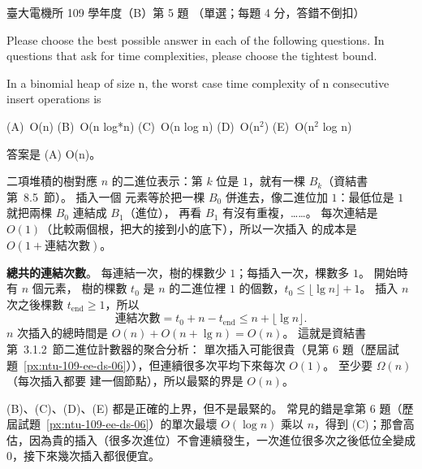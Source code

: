 \begin{pastexam}[label={px:ntu-109-ee-ds-05}]{臺大電機所 109 學年度（B）第 5 題}
（單選；每題 4 分，答錯不倒扣）

Please choose the best possible answer in each of the following questions. In questions that ask
for time complexities, please choose the tightest bound.

In a binomial heap of size n, the worst case time complexity of n consecutive insert operations is

(A)~O(n) \qquad (B)~O(n log*n) \qquad (C)~O(n log n) \qquad (D)~O(n$^2$) \qquad (E)~O(n$^2$ log n)
\end{pastexam}

\begin{pastsoln}
答案是 (A) O(n)。

二項堆積的樹對應 $n$ 的二進位表示：第 $k$ 位是 $1$，就有一棵 $B_k$（資結書第~8.5~節）。 插入一個
元素等於把一棵 $B_0$ 併進去，像二進位加 $1$：最低位是 $1$ 就把兩棵 $B_0$ 連結成 $B_1$（進位），
再看 $B_1$ 有沒有重複，……。 每次連結是 $O(1)$（比較兩個根，把大的接到小的底下），所以一次插入
的成本是 $O(1 + \text{連結次數})$。

\textbf{總共的連結次數}。 每連結一次，樹的棵數少 $1$；每插入一次，棵數多 $1$。 開始時有 $n$ 個元素，
樹的棵數 $t_0$ 是 $n$ 的二進位裡 $1$ 的個數，$t_0 \le \lfloor \lg n \rfloor + 1$。 插入 $n$ 次之後棵數
$t_{\text{end}} \ge 1$，所以
\[
\text{連結次數} = t_0 + n - t_{\text{end}} \le n + \lfloor \lg n \rfloor.
\]
$n$ 次插入的總時間是 $O(n) + O(n + \lg n) = O(n)$。 這就是資結書第~3.1.2~節二進位計數器的聚合分析：
單次插入可能很貴（見第 6 題（歷屆試題~\ref{px:ntu-109-ee-ds-06}）），但連續很多次平均下來每次 $O(1)$。 至少要 $\Omega(n)$（每次插入都要
建一個節點），所以最緊的界是 $O(n)$。

(B)、(C)、(D)、(E) 都是正確的上界，但不是最緊的。 常見的錯是拿第 6 題（歷屆試題~\ref{px:ntu-109-ee-ds-06}）的單次最壞 $O(\log n)$ 乘以
$n$，得到 (C)；那會高估，因為貴的插入（很多次進位）不會連續發生，一次進位很多次之後低位全變成
$0$，接下來幾次插入都很便宜。
\end{pastsoln}
